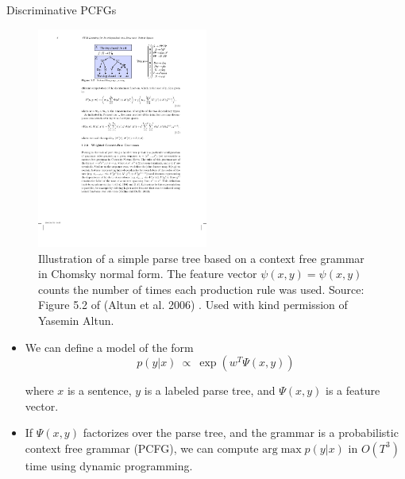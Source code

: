 \documentclass[10pt,mathserif]{beamer}
\begin{document}
\begin{frame}{Discriminative PCFGs}
\begin{figure}[h]
\centering
\includegraphics[width=0.5\textwidth]{altun06-cfg}
\caption{Illustration of a simple parse tree based on a context free grammar in Chomsky normal form. The feature vector $\psi(x, y) = \psi(x, y)$ counts the number of times each production rule was used. Source: Figure 5.2 of (Altun et al. 2006) . Used with kind permission of Yasemin Altun.}
\end{figure}

\begin{itemize}
\item We can define a model of the form
\begin{equation}
    p(y|x) \ \propto \ \exp(w^T \Psi(x, y))
\end{equation}

where $x$ is a sentence, $y$ is a labeled parse tree, and $\Psi(x, y)$ is a feature vector.
\item If $\Psi(x, y)$ factorizes over the parse tree, and the grammar is a probabilistic context free grammar (PCFG), we can compute $\text{arg}\max p(y|x)$ in $O(T^3)$ time using dynamic programming.
\end{itemize}
\end{frame}

                
\end{document}
